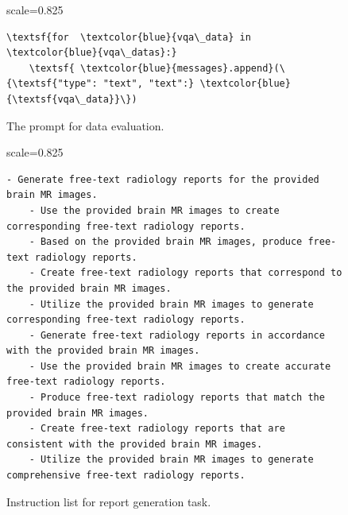 \begin{figure}[t]
\begin{adjustbox}{scale=0.825}
\begin{minipage}{1.2\columnwidth}
\begin{Verbatim}[frame=single, numbersep=5pt,
                 commandchars=\\\{\}, breaklines=true,  
                 breaksymbolleft={}, breaksymbolright={}]
\textsf{for  \textcolor{blue}{vqa\_data} in  \textcolor{blue}{vqa\_datas}:}
    \textsf{ \textcolor{blue}{messages}.append}(\{\textsf{"type": "text", "text":} \textcolor{blue}{\textsf{vqa\_data}}\})
\end{Verbatim}
\end{minipage}
\end{adjustbox}
\centering
\vspace{-7pt}
\caption{The prompt for data evaluation.}
\label{figD}
\vspace{-3pt}
\end{figure}

\begin{figure}[t]
\centering
\begin{adjustbox}{scale=0.825}
\begin{minipage}{1.2\columnwidth}
\begin{Verbatim}[frame=single, numbersep=5pt,
                 commandchars=\\\{\}]
    - Generate free-text radiology reports for the provided brain MR images.
    - Use the provided brain MR images to create corresponding free-text radiology reports.
    - Based on the provided brain MR images, produce free-text radiology reports.
    - Create free-text radiology reports that correspond to the provided brain MR images.
    - Utilize the provided brain MR images to generate corresponding free-text radiology reports.
    - Generate free-text radiology reports in accordance with the provided brain MR images.
    - Use the provided brain MR images to create accurate free-text radiology reports.
    - Produce free-text radiology reports that match the provided brain MR images.
    - Create free-text radiology reports that are consistent with the provided brain MR images.
    - Utilize the provided brain MR images to generate comprehensive free-text radiology reports.
\end{Verbatim}
\end{minipage}
\end{adjustbox}
\centering
\vspace{-7pt}
\caption{Instruction list for report generation task.}
\label{figE}
\vspace{-3pt}
\end{figure}

